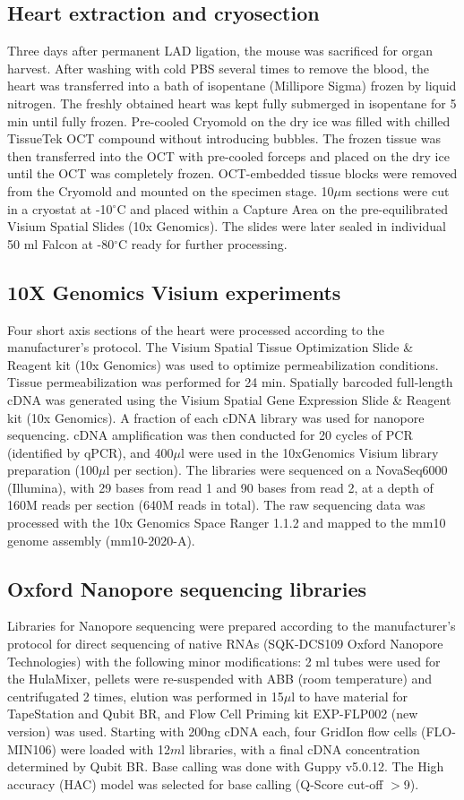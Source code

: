 \documentclass[utf8]{FrontiersinHarvard} %
\begin{document}
\subsection*{Heart extraction and cryosection}
Three days after permanent LAD ligation, the mouse was sacrificed for organ harvest. After washing with cold PBS several times to remove the blood, the heart was transferred into a bath of isopentane (Millipore Sigma) frozen by liquid nitrogen. The freshly obtained heart was kept fully submerged in isopentane for 5 min until fully frozen. Pre-cooled Cryomold on the dry ice was filled with chilled TissueTek OCT compound without introducing bubbles. The frozen tissue was then transferred into the OCT with pre-cooled forceps and placed on the dry ice until the OCT was completely frozen. OCT-embedded tissue blocks were removed from the Cryomold and mounted on the specimen stage. 10$\mu$m sections were cut in a cryostat at -10$^\circ$C and placed within a Capture Area on the pre-equilibrated Visium Spatial Slides (10x Genomics). The slides were later sealed in individual 50 ml Falcon at -80$^\circ$C ready for further processing. 

\subsection*{10X Genomics Visium experiments}
Four short axis sections of the heart were processed according to the manufacturer's protocol. The Visium Spatial Tissue Optimization Slide \& Reagent kit (10x Genomics) was used to optimize permeabilization conditions. Tissue permeabilization was performed for 24 min. Spatially barcoded full-length cDNA was generated using the Visium Spatial Gene Expression Slide \& Reagent kit (10x Genomics). A fraction of each cDNA library was used for nanopore sequencing. cDNA amplification was then conducted for 20 cycles of PCR (identified by qPCR), and 400$\mu$l were used in the 10xGenomics Visium library preparation (100$\mu$l per section). The libraries were sequenced on a NovaSeq6000 (Illumina), with 29 bases from read 1 and 90 bases from read 2, at a depth of 160M reads per section (640M reads in total). The raw sequencing data was processed with the 10x Genomics Space Ranger 1.1.2 and mapped to the mm10 genome assembly (mm10-2020-A).

\subsection*{Oxford Nanopore sequencing libraries}
Libraries for Nanopore sequencing were prepared according to the manufacturer's protocol for direct sequencing of native RNAs (SQK-DCS109 Oxford Nanopore Technologies) with the following minor modifications: 2 ml tubes were used for the HulaMixer, pellets were re-suspended with ABB (room temperature) and centrifugated 2 times, elution was performed in 15$\mu$l to have material for TapeStation and Qubit BR, and Flow Cell Priming kit EXP-FLP002 (new version) was used. Starting with 200ng cDNA each, four GridIon flow cells (FLO-MIN106) were loaded with 12$m$l libraries, with a final cDNA concentration determined by Qubit BR. Base calling was done with Guppy v5.0.12. The High accuracy (HAC) model was selected for base calling (Q-Score cut-off $>$9).
\end{document}

